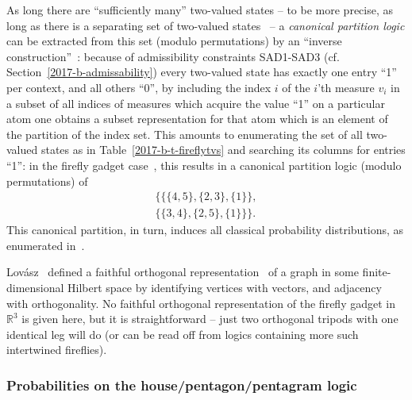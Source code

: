 As long there are ``sufficiently many'' two-valued states -- to be more precise,
as long as there is a separating set of two-valued states~\cite[Theorem~0]{kochen1} --
a {\em canonical partition logic} can be extracted from this set (modulo permutations)
by an ``inverse construction''~\cite{svozil-2001-eua,svozil-2008-ql}:
because of admissibility constraints SAD1-SAD3 (cf. Section~\ref{2017-b-admissability})
every two-valued state has exactly one entry ``1'' per context, and all others ``0'',
by including the index $i$ of the $i$'th measure $v_i$ in a subset of all indices of measures which acquire the value ``1'' on a particular atom
one obtains a subset representation for that atom which is an element of the partition of the index set.
This amounts to enumerating the set of all two-valued states as in Table~\ref{2017-b-t-fireflytvs} and searching its columns for entries ``1'':
in the firefly gadget case~\cite{dvur-pul-svo,svozil-2008-ql}, this results in a  canonical partition logic  (modulo permutations) of
\begin{equation}
\begin{split}
\{
\{
\{4,5\},\{2,3\},\{1\}
\}
,\\
\{
\{3,4\},\{2,5\},\{1\}
\}
\}.
\end{split}
\end{equation}
This canonical partition, in turn, induces all classical probability distributions, as enumerated in~\cite[Figure~12.4]{svozil-2016-pu-book}.

Lov\'asz~\cite{lovasz-79,lovasz-89}
defined a faithful orthogonal representation~\cite{Portillo-2015}
of a graph in some finite-dimensional Hilbert space by identifying
vertices with vectors, and adjacency with orthogonality.
No faithful orthogonal representation of the firefly gadget in $\mathbb{R}^3$ is given here, but it is straightforward --
just two orthogonal tripods with one identical leg will do (or can be read off from
logics containing more such intertwined fireflies).

\subsubsection{Probabilities on the house/pentagon/pentagram logic}
\label{2017-b-kcbsi}


